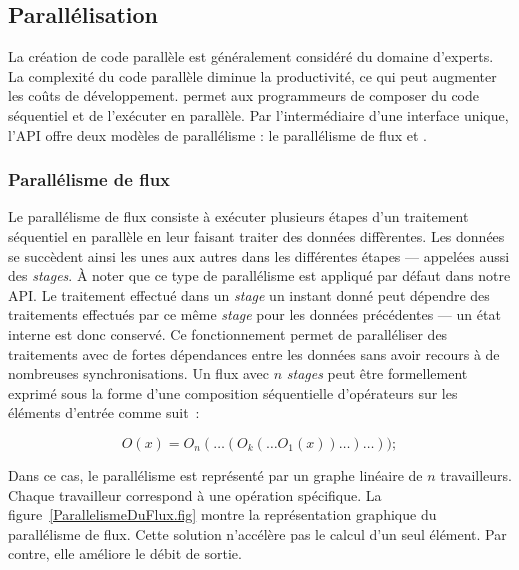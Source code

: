 \subsection{Parall\'elisation}

La cr\'eation de code parall\`ele est g\'en\'eralement consid\'er\'e du domaine d'experts. La complexit\'e du code parall\`ele diminue la productivit\'e, ce qui peut augmenter les co\^uts de d\'eveloppement.  permet aux programmeurs de composer du code s\'equentiel et de l'ex\'ecuter en parall\`ele. Par l'interm\'ediaire d'une interface unique, l'API offre deux mod\`eles de parall\'elisme : le parall\'elisme de flux et .



\subsubsection{Parall\'elisme de flux}

Le parall\'elisme de flux consiste \`a ex\'ecuter plusieurs \'etapes d'un traitement s\'equentiel en parall\`ele en leur faisant traiter des données diff\`erentes. Les donn\'ees se succ\`edent ainsi les unes aux autres dans les diff\'erentes \'etapes --- appel\'ees  aussi des \emph{stages}. \`A noter que ce type de parall\'elisme est appliqu\'e par d\'efaut dans notre API. Le traitement effectu\'e dans un \emph{stage} un instant donn\'e peut d\'ependre des traitements effectu\'es par ce m\^eme \emph{stage} pour les donn\'ees pr\'ec\'edentes --- un \'etat interne est donc conserv\'e. Ce fonctionnement permet de parall\'eliser des traitements avec de fortes d\'ependances entre les donn\'ees sans avoir recours \`a de nombreuses synchronisations. 
Un flux avec $n$ \emph{stages} peut \^etre formellement exprim\'e sous la forme d'une composition s\'equentielle d'op\'erateurs sur les \'el\'ements d'entr\'ee comme suit~: 

\[
	O(x) = O_n( \ldots (O_k( \ldots O_1(x)) \ldots ) \ldots ));
\]

Dans ce cas, le parall\'elisme est repr\'esent\'e par un graphe lin\'eaire de $n$ travailleurs. Chaque travailleur correspond \`a une op\'eration sp\'ecifique. La figure~\ref{ParallelismeDuFlux.fig} montre la repr\'esentation graphique du parall\'elisme de flux. Cette solution n'acc\'el\`ere pas le calcul d'un seul \'el\'ement. Par contre, elle am\'eliore le d\'ebit de sortie.

